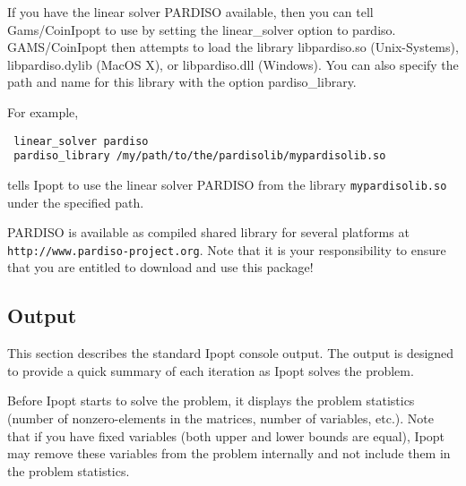 If you have the linear solver PARDISO available, then you can tell Gams/CoinIpopt to use by setting the linear\_solver option to pardiso.
GAMS/CoinIpopt then attempts to load the library libpardiso.so (Unix-Systems), libpardiso.dylib (MacOS X), or libpardiso.dll (Windows).
You can also specify the path and name for this library with the option pardiso\_library.

For example,
\begin{verbatim}
 linear_solver pardiso
 pardiso_library /my/path/to/the/pardisolib/mypardisolib.so
\end{verbatim}
tells Ipopt to use the linear solver PARDISO from the library \verb=mypardisolib.so= under the specified path.

PARDISO is available as compiled shared library for several platforms at \texttt{http://www.pardiso-project.org}.
Note that it is your responsibility to ensure that you are entitled to download and use this package!

\subsection{Output}

This section describes the standard Ipopt console output.
The output is designed to provide a quick summary of each iteration as Ipopt solves the problem.

Before Ipopt starts to solve the problem, it displays the problem statistics (number of nonzero-elements in the matrices, number of variables, etc.).
Note that if you have fixed variables (both upper and lower bounds are equal), Ipopt may remove these variables from the problem internally and not include them in the problem statistics.

